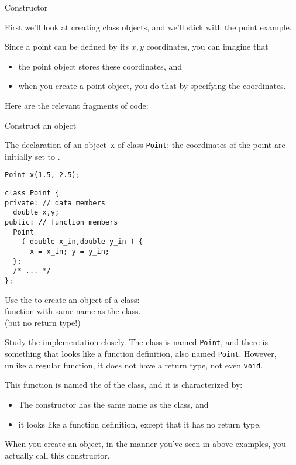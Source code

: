  {Constructor}
\label{sec:simple-constructor}

First we'll look at creating class objects,
and we'll stick with the point example.

Since a point can be defined by its $x,y$ coordinates,
you can imagine that
\begin{itemize}
\item
  the point object stores these coordinates, and
\item when you create a point object, you do that by
  specifying the coordinates.
\end{itemize}

Here are the relevant fragments of code:
\begin{block}{Construct an object}
  \label{sl:point-construct-use}
\begin{multicols}{2}
  The declaration of an object~\lstinline{x}
  of class \lstinline+Point+;
  the coordinates of the point are initially
  set to .
\begin{lstlisting}
Point x(1.5, 2.5);
\end{lstlisting}
%
\columnbreak
%
  \lstset{style=snippetcode}
\begin{lstlisting}
class Point {
private: // data members
  double x,y;
public: // function members
  Point
    ( double x_in,double y_in ) {
      x = x_in; y = y_in;
  };
  /* ... */
};
\end{lstlisting}
\end{multicols}
\begin{tldr}
  Use the  to create an object of a class:\\
  function with same name as the class.\\
  (but no return type!)
\end{tldr}
\end{block}

Study the implementation closely.
The class is named \lstinline{Point},
and there is something that looks like a function definition,
also named \lstinline{Point}.
However, unlike a regular function, it does not have a return type,
not even \lstinline{void}.

This function is named the  of the class,
and it is characterized by:
\begin{itemize}
\item The constructor has the same name as the class, and
\item it looks like a function definition,
  except that it has no return type.
\end{itemize}
When you create an object,
in the manner you've seen in above examples,
you actually call this constructor.

